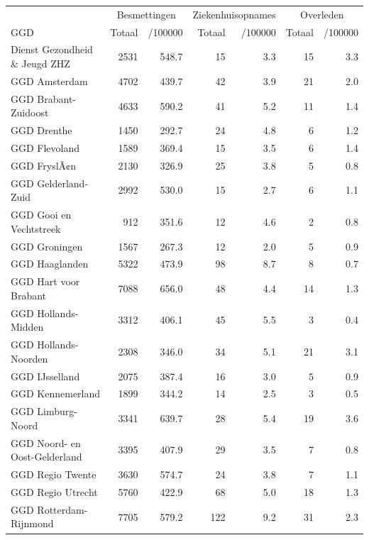 \documentclass[
  english,
  man,floatsintext]{apa6}
\begin{document}
\begin{table}
\centering\begingroup\fontsize{10}{12}\selectfont

\begin{threeparttable}
\begin{tabular}{lrrrrrr}
\toprule
\multicolumn{1}{c}{ } & \multicolumn{2}{c}{Besmettingen} & \multicolumn{2}{c}{Ziekenhuisopnames} & \multicolumn{2}{c}{Overleden} \\
\cmidrule(l{3pt}r{3pt}){2-3} \cmidrule(l{3pt}r{3pt}){4-5} \cmidrule(l{3pt}r{3pt}){6-7}
GGD & Totaal & /100000 & Totaal & /100000 & Totaal & /100000\\
\midrule
Dienst Gezondheid \& Jeugd ZHZ & 2531 & 548.7 & 15 & 3.3 & 15 & 3.3\\
GGD Amsterdam & 4702 & 439.7 & 42 & 3.9 & 21 & 2.0\\
GGD Brabant-Zuidoost & 4633 & 590.2 & 41 & 5.2 & 11 & 1.4\\
GGD Drenthe & 1450 & 292.7 & 24 & 4.8 & 6 & 1.2\\
GGD Flevoland & 1589 & 369.4 & 15 & 3.5 & 6 & 1.4\\
GGD FryslÃ¢n & 2130 & 326.9 & 25 & 3.8 & 5 & 0.8\\
GGD Gelderland-Zuid & 2992 & 530.0 & 15 & 2.7 & 6 & 1.1\\
GGD Gooi en Vechtstreek & 912 & 351.6 & 12 & 4.6 & 2 & 0.8\\
GGD Groningen & 1567 & 267.3 & 12 & 2.0 & 5 & 0.9\\
GGD Haaglanden & 5322 & 473.9 & 98 & 8.7 & 8 & 0.7\\
GGD Hart voor Brabant & 7088 & 656.0 & 48 & 4.4 & 14 & 1.3\\
GGD Hollands-Midden & 3312 & 406.1 & 45 & 5.5 & 3 & 0.4\\
GGD Hollands-Noorden & 2308 & 346.0 & 34 & 5.1 & 21 & 3.1\\
GGD IJsselland & 2075 & 387.4 & 16 & 3.0 & 5 & 0.9\\
GGD Kennemerland & 1899 & 344.2 & 14 & 2.5 & 3 & 0.5\\
GGD Limburg-Noord & 3341 & 639.7 & 28 & 5.4 & 19 & 3.6\\
GGD Noord- en Oost-Gelderland & 3395 & 407.9 & 29 & 3.5 & 7 & 0.8\\
GGD Regio Twente & 3630 & 574.7 & 24 & 3.8 & 7 & 1.1\\
GGD Regio Utrecht & 5760 & 422.9 & 68 & 5.0 & 18 & 1.3\\
GGD Rotterdam-Rijnmond & 7705 & 579.2 & 122 & 9.2 & 31 & 2.3\\

\end{tabular}
\end{threeparttable}
\end{table}
\end{document}
